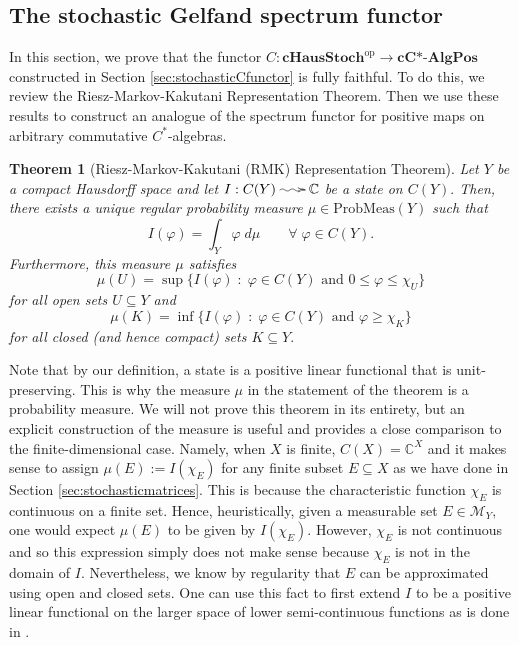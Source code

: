 \documentclass[12pt]{article}
\makeatletter
\theoremstyle{theorem}
\newtheorem{theorem}[equation]{Theorem}
\theoremstyle{definition}
\numberwithin{equation}{section}
\let\C=\Chi \let\W=\Omega
\def\vf{\varphi}
\newcommand{\be}{\begin{equation}}
\newcommand{\ee}{\end{equation}}
\newcommand{\bt}{\begin{theorem}}
\newcommand{\et}{\end{theorem}}
\newcommand{\<}{\langle}
\renewcommand{\>}{\rangle}
\def\C{{{\mathbb C}}}
\newcommand{\cCAlgPos}{\mathbf{cC\text{*-}AlgPos}}
\newcommand{\op}{\mathrm{op}}
\newcommand{\cHStoch}{\mathbf{cHausStoch}}
\newcommand{\stoch}{\;\xy0;/r.25pc/:\ar@{~>}(3,0);(-3,0);\endxy\;}
\makeatother
\begin{document}
\subsection{The stochastic Gelfand spectrum functor}
\label{sec:stochasticGelfandspectrumfunctor}

In this section, we prove that the functor 
$C:\cHStoch^{\op}\to\cCAlgPos$ 
constructed in Section \ref{sec:stochasticCfunctor} is fully faithful. 
To do this, we review the 
Riesz-Markov-Kakutani Representation Theorem.
Then we use these results to construct an analogue of the spectrum 
functor for positive maps on arbitrary commutative $C^*$-algebras. 

\bt
[Riesz-Markov-Kakutani (RMK) Representation Theorem]
\label{thm:Riesz}
Let $Y$ be a compact Hausdorff space and 
let $I:C(Y)\stoch\C$ be a state on $C(Y).$ 
Then, there exists a unique regular probability measure
$\mu\in\mathrm{ProbMeas}(Y)$ such that 
\be
I(\vf)=\int_{Y}\vf\;d\mu\qquad\forall\;\vf\in C(Y).
\ee
Furthermore, this measure $\mu$ satisfies 
\be
\mu(U)=\sup\big\{ I(\vf)\;:\;\vf\in C(Y)
\text{ and }0\le\vf\le\chi_{U}\big\}
\ee
for all open sets $U\subseteq Y$ and 
\be
\mu(K)=\inf\big\{I(\vf)\;:\;\vf\in C(Y)
\text{ and }\vf\ge\chi_{K}\big\}
\ee
for all closed (and hence compact) sets $K\subseteq Y.$ 
\et

Note that by our definition, a state is a positive linear functional that
is unit-preserving. This is why the measure $\mu$ 
in the statement of the theorem is a probability measure. 
We will not prove this theorem in its entirety, 
but an explicit construction of the measure
is useful and provides a close comparison to the finite-dimensional case. 
Namely, when $X$ is finite, $C(X)=\C^{X}$ and it makes sense 
to assign $\mu(E):=I(\chi_{E})$ for any finite subset $E\subseteq X$ 
as we have done in Section \ref{sec:stochasticmatrices}. 
This is because the characteristic function $\chi_{E}$ is continuous on a finite set. 
Hence, heuristically, given a measurable set $E\in\mathcal{M}_{Y},$
one would expect $\mu(E)$ to be given by $I(\chi_{E}).$
However, $\chi_{E}$ is not continuous and so this expression simply does not make 
sense because $\chi_{E}$ is not in the domain of $I.$ 
Nevertheless, we know by regularity that $E$ can be approximated using 
open and closed sets. One can use this fact to first extend $I$ to be a positive linear
functional on the larger space of lower semi-continuous functions
as is done in \cite{Ta09_245B12}. 
\end{document}
